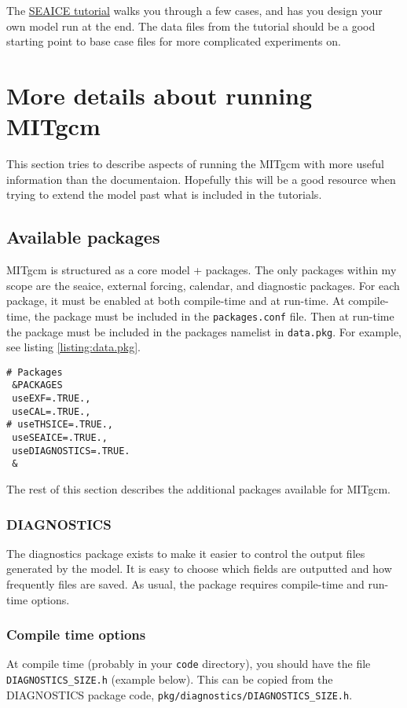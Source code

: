 \documentclass[11pt]{article}
\begin{document}
The \href{https://wiki.math.uwaterloo.ca/fluidswiki/index.php?title=SEAICE_tutorial}{SEAICE tutorial} walks you through a few cases, and has you design your own model run at the end. The data files from the tutorial should be a good starting point to base case files for more complicated experiments on.

\section{More details about running MITgcm}
This section tries to describe aspects of running the MITgcm with more useful information than the documentaion. Hopefully this will be a good resource when trying to extend the model past what is included in the tutorials.

\subsection{Available packages}
MITgcm is structured as a core model + packages. The only packages within my scope are the seaice, external forcing, calendar, and diagnostic packages. For each package, it must be enabled at both compile-time and at run-time. At compile-time, the package must be included in the \verb|packages.conf| file. Then at run-time the package must be included in the packages namelist in \verb|data.pkg|. For example, see listing \ref{listing:data.pkg}.

\begin{lstlisting}[caption={Sample data.pkg file. This would enable the EXF, CAL, SEAICE, and DIAGNOSTICS packages, and disable the THSICE package.}, label={listing:data.pkg}]
# Packages
 &PACKAGES
 useEXF=.TRUE.,
 useCAL=.TRUE.,
# useTHSICE=.TRUE.,
 useSEAICE=.TRUE.,
 useDIAGNOSTICS=.TRUE.
 &
\end{lstlisting}

The rest of this section describes the additional packages available for MITgcm.

\subsubsection{DIAGNOSTICS}
The diagnostics package exists to make it easier to control the output files generated by the model. It is easy to choose which fields are outputted and how frequently files are saved. As usual, the package requires compile-time and run-time options.

\subsubsection*{Compile time options}
At compile time (probably in your \verb|code| directory), you should have the file \verb|DIAGNOSTICS_SIZE.h| (example below). This can be copied from the DIAGNOSTICS package code, \verb|pkg/diagnostics/DIAGNOSTICS_SIZE.h|.
\end{document}
